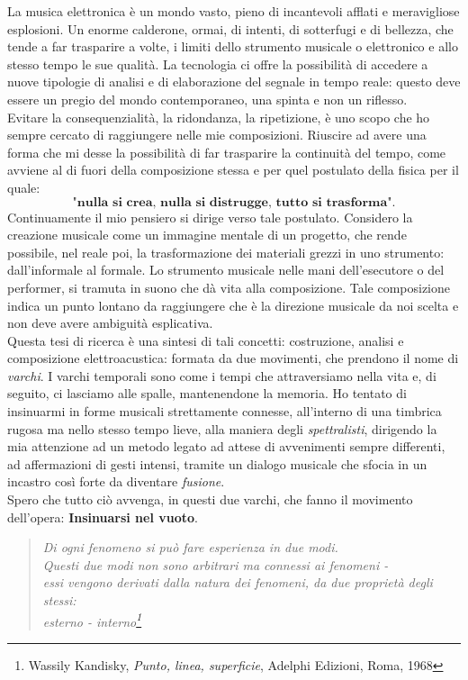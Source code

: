 La musica elettronica è un mondo vasto, pieno di incantevoli afflati e meravigliose esplosioni. Un enorme calderone, ormai, di intenti, di sotterfugi e di bellezza, che tende a far trasparire a volte, i limiti dello strumento musicale o elettronico e allo stesso tempo le sue qualità. La tecnologia ci offre la possibilità di accedere a nuove tipologie di analisi e di elaborazione del segnale in tempo reale: questo deve essere un pregio del mondo contemporaneo, una spinta e non un riflesso. \\
Evitare la consequenzialità, la ridondanza, la ripetizione, è uno scopo che ho sempre cercato di raggiungere nelle mie composizioni. Riuscire ad avere una forma che mi desse la possibilità di far trasparire la continuità del tempo, come avviene al di fuori della composizione stessa e per quel postulato della fisica per il quale: 
\[ 
\textbf{"nulla si crea, nulla si distrugge, tutto si trasforma".}
\]
Continuamente il mio pensiero si dirige verso tale postulato. Considero la creazione musicale come un immagine mentale di un progetto, che rende possibile, nel reale poi, la trasformazione dei materiali grezzi in uno strumento: dall'informale al formale.
Lo strumento musicale nelle mani dell'esecutore o del performer, si tramuta in suono che dà vita alla composizione. Tale composizione indica un punto lontano da raggiungere che è la direzione musicale da noi scelta e non deve avere ambiguità esplicativa. \\ 
Questa tesi di ricerca è una sintesi di tali concetti: costruzione, analisi e composizione elettroacustica: formata da due movimenti, che prendono il nome di \textit{varchi}. I varchi temporali sono come i tempi che attraversiamo nella vita e, di seguito, ci lasciamo alle spalle, mantenendone la memoria. Ho tentato di insinuarmi in forme musicali strettamente connesse, all'interno di una timbrica rugosa ma nello stesso tempo lieve, alla maniera degli \textit{spettralisti}, dirigendo la mia attenzione ad un metodo legato ad attese di avvenimenti sempre differenti, ad affermazioni di gesti intensi, tramite un dialogo musicale che sfocia in un incastro così forte da diventare \textit{fusione}. \\
Spero che tutto ciò avvenga, in questi due varchi, che fanno il movimento dell'opera: \textbf{Insinuarsi nel vuoto}. 

\begin{small}
\begin{quotation}
\textit{Di ogni fenomeno si può fare esperienza in due modi. \\
Questi due modi non sono arbitrari ma connessi ai fenomeni - \\
essi vengono derivati dalla natura dei fenomeni, da due proprietà degli stessi: \\
esterno - interno\footnote{Wassily Kandisky, \textit{Punto, linea, superficie}, Adelphi Edizioni, Roma, 1968}}
\end{quotation}
\end{small}


